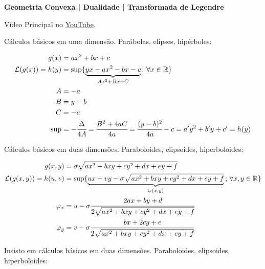 \documentclass[12pt]{article}
\begin{document}
\Large

\begin{center}
\textbf{Geometria Convexa | Dualidade | Transformada de Legendre}
\end{center}

\large

V\'ideo Principal no \href{https://www.youtube.com/watch?v=KlShZXH1WrE}{\color{blue}\underline{YouTube}}.

\vspace{3mm}

C\'alculos b\'asicos em uma dimens\~ao. Par\'abolas, elipses, hip\'erboles:

\begin{align}
g(x) &= ax^2 + bx + c \\
\mathcal{L}(g(x)) = h(y) &= \sup \{ \underbrace{yx - ax^2 - bx - c}_{Ax^2 + Bx + C}\,;\,\forall x \in \mathbb{R} \} \\
A &= -a \\
B &= y - b \\
C &= -c \\
\sup &= -\cfrac{\Delta}{4A} = \cfrac{B^2+4aC}{4a} = \cfrac{(y-b)^2}{4a} - c = a'y^2 + b'y + c' = h(y)
\end{align}

\vspace{3mm}

C\'alculos b\'asicos em duas dimens\~oes. Paraboloides, elipsoides, hiperboloides:

\begin{align}
g(x,y) &= \sigma \sqrt{ax^2 + bxy + cy^2 + dx + ey + f} \\
\mathcal{L}(g(x,y)) = h(u,v) &= \sup \{ \underbrace{ux + vy - \sigma \sqrt{ax^2 + bxy + cy^2 + dx + ey + f}}_{\varphi(x,y)}\,;\,\forall x,y \in \mathbb{R} \} \\
\varphi_x &= u - \sigma \cfrac{2ax + by + d}{2\sqrt{ax^2 + bxy + cy^2 + dx + ey + f}} \\
\varphi_y &= v - \sigma \cfrac{bx + 2cy + e}{2\sqrt{ax^2 + bxy + cy^2 + dx + ey + f}}
\end{align}

\vspace{300mm}

Insisto em c\'alculos b\'asicos em duas dimens\~oes. Paraboloides, elipsoides, hiperboloides:
\end{document}
